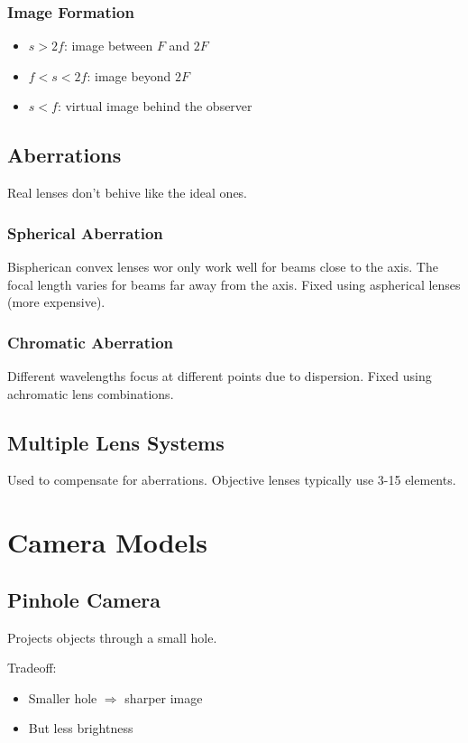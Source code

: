\documentclass{article}
\begin{document}
\subsubsection{Image Formation}
\begin{itemize}
  \item $s > 2f$: image between $F$ and $2F$
  \item $f < s < 2f$: image beyond $2F$
  \item $s < f$: virtual image behind the observer
\end{itemize}

\subsection{Aberrations}
Real lenses don't behive like the ideal ones.
\subsubsection{Spherical Aberration}
Bispherican convex lenses wor only work well for beams close to the axis. The focal length varies for beams far away from the axis.
Fixed using aspherical lenses (more expensive).

\subsubsection{Chromatic Aberration}
Different wavelengths focus at different points due to dispersion.  
Fixed using achromatic lens combinations.

\subsection{Multiple Lens Systems}
Used to compensate for aberrations.  
Objective lenses typically use 3-15 elements.

\section{Camera Models}

\subsection{Pinhole Camera}
Projects objects through a small hole.

Tradeoff:
\begin{itemize}
  \item Smaller hole $\Rightarrow$ sharper image
  \item But less brightness
\end{itemize}
\end{document}
